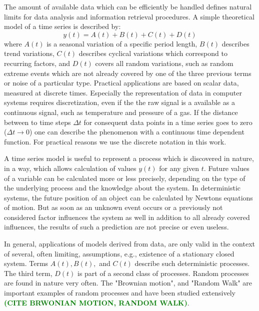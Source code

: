 \documentclass[a4paper,10pt]{scrbook}
\begin{document}
The amount of available data which can be efficiently be handled defines natural limits for data analysis and information retrieval procedures. A simple theoretical model of a time series is described by:
\begin{equation}
\label{tsmodel}
y(t) = A(t) + B(t) + C(t) + D(t)
\end{equation}
where $A(t)$ is a seasonal variation of a specific period length, $B(t)$ describes trend variations, $C(t)$ describes cyclical variations which correspond to recurring factors, and $D(t)$ covers all random variations, such as random extreme events which are not already covered by one of the three previous terms or noise of a particular type. Practical applications are based on scalar data, measured at discrete times. Especially the representation of data in computer systems requires discretization, even if the the raw signal is a available as a continuous signal, such as temperature and pressure of a gas. If the distance between to time steps $\Delta t$ for consequent data points in a time series goes to zero ($\Delta t \rightarrow 0$) one can describe the phenomenon with a continuous time dependent function. For practical reasons we use the discrete notation in this work.  

A time series model is useful to represent a process which is discovered in nature, in a way, which allows calculation of values $y(t)$ for any given $t$. Future values of a variable can be calculated more or less precisely, depending on the type of the underlying process and the knowledge about the system. In deterministic systems, the future position of an object can be calculated by Newtons equations of motion. But as soon as an unknown event occurs or a previously not considered factor influences the system as well in addition to all already covered influences, the results of such a prediction are not precise or even useless. 

In general, applications of models derived from data, are only valid in the context of several, often limiting, assumptions, e.g., existence of a stationary closed system. Terms $A(t), B(t),$ and $C(t)$ describe such deterministic processes. The third term, $D(t)$ is part of a second class of processes. Random processes are found in nature very often. The "Brownian motion", and "Random Walk" are important examples of random processes and have been studied extensively \textbf{\textcolor{green}{(CITE BRWONIAN MOTION, RANDOM WALK)}}. 
\end{document}
